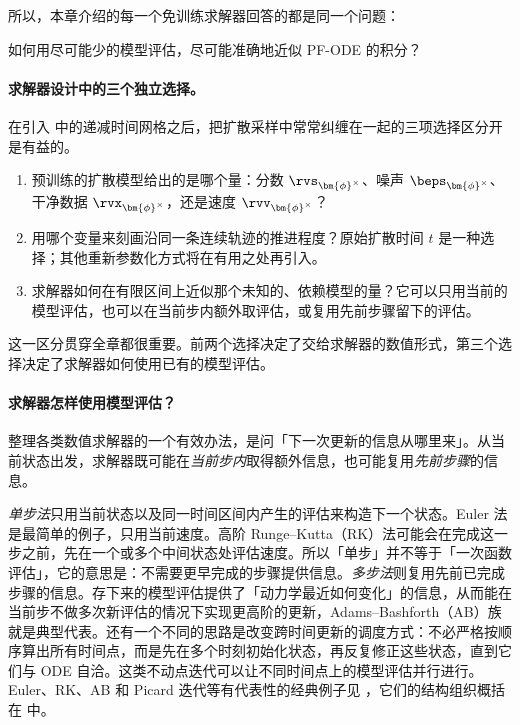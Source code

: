 所以，本章介绍的每一个免训练求解器回答的都是同一个问题：
\begin{question}
如何用尽可能少的模型评估，尽可能准确地近似 PF-ODE 的积分？
\end{question}

\paragraph{求解器设计中的三个独立选择。}
在引入  中的递减时间网格之后，把扩散采样中常常纠缠在一起的三项选择区分开是有益的。

\begin{enumerate}
    \item {}
    预训练的扩散模型给出的是哪个量：分数 $\rvs_{\bm{\phi}^\times}$、噪声 $\beps_{\bm{\phi}^\times}$、干净数据 $\rvx_{\bm{\phi}^\times}$，还是速度 $\rvv_{\bm{\phi}^\times}$？

    \item {}
    用哪个变量来刻画沿同一条连续轨迹的推进程度？原始扩散时间 $t$ 是一种选择；其他重新参数化方式将在有用之处再引入。

    \item {}
    求解器如何在有限区间上近似那个未知的、依赖模型的量？它可以只用当前的模型评估，也可以在当前步内额外取评估，或复用先前步骤留下的评估。
\end{enumerate}
这一区分贯穿全章都很重要。前两个选择决定了交给求解器的数值形式，第三个选择决定了求解器如何使用已有的模型评估。


\paragraph{求解器怎样使用模型评估？}
整理各类数值求解器的一个有效办法，是问「下一次更新的信息从哪里来」。从当前状态出发，求解器既可能在\emph{当前步内}取得额外信息，也可能复用\emph{先前步骤}的信息。

\emph{单步法}只用当前状态以及同一时间区间内产生的评估来构造下一个状态。Euler 法是最简单的例子，只用当前速度。高阶 Runge--Kutta（RK）法可能会在完成这一步之前，先在一个或多个中间状态处评估速度。所以「单步」并不等于「一次函数评估」，它的意思是：不需要更早完成的步骤提供信息。\emph{多步法}则复用先前已完成步骤的信息。存下来的模型评估提供了「动力学最近如何变化」的信息，从而能在当前步不做多次新评估的情况下实现更高阶的更新，Adams--Bashforth（AB）族就是典型代表。还有一个不同的思路是改变跨时间更新的调度方式：不必严格按顺序算出所有时间点，而是先在多个时刻初始化状态，再反复修正这些状态，直到它们与 ODE 自洽。这类不动点迭代可以让不同时间点上的模型评估并行进行。Euler、RK、AB 和 Picard 迭代等有代表性的经典例子见 ，它们的结构组织概括在  中。

